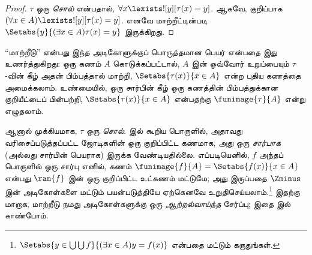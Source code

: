 \documentclass[../../../include/open-logic-section]{subfiles}
\begin{document}
\begin{proof}
$\tau$ ஒரு \emph{சொல்} என்பதால், $\forall x
\lexists![y][\tau(x) = y]$. ஆகவே, குறிப்பாக $(\forall x \in
A)\lexists![y][\tau(x) = y]$. எனவே மாற்றீட்டின்படி
$\Setabs{y}{(\exists x \in A)\tau(x) = y}$ இருக்கிறது.
\end{proof}
\noindent
``மாற்றீடு'' என்பது இந்த அடிகோளுக்குப் பொருத்தமான பெயர் என்பதை இது
உணர்த்துகிறது: ஒரு கணம் $A$ கொடுக்கப்பட்டால், $A$ இன் ஒவ்வோர் உறுப்பையும்
$\tau$-வின் கீழ் அதன் பிம்பத்தால் மாற்றி, $\Setabs{\tau(x)}{x \in A}$
என்ற புதிய கணத்தை அமைக்கலாம். உண்மையில், ஒரு சார்பின் கீழ் ஒரு கணத்தின்
பிம்பத்துக்கான குறியீட்டைப் பின்பற்றி, $\Setabs{\tau(x)}{x \in A}$
என்பதற்கு $\funimage{\tau}{A}$ என்று எழுதலாம்.

ஆனால் முக்கியமாக, $\tau$ ஒரு \emph{சொல்}. 
இல் கூறிய பொருளில், அதாவது வரிசைப்படுத்தப்பட்ட ஜோடிகளின் ஒரு குறிப்பிட்ட
கணமாக, அது ஒரு \emph{சார்பாக} (அல்லது சார்பின் பெயராக) இருக்க வேண்டியதில்லை.
எப்படியெனில், $f$ அந்தப் பொருளில் ஒரு சார்பு எனில், கணம்
$\funimage{f}{A} = \Setabs{f(x)}{x \in A}$ என்பது $\ran{f}$ இன் ஒரு
குறிப்பிட்ட உட்கணம் மட்டுமே; அது இருப்பதை $\Zminus$ இன் அடிகோள்களை மட்டும்
பயன்படுத்தியே ஏற்கெனவே உறுதிசெய்யலாம்.\footnote{$\Setabs{y \in \bigcup
\bigcup f}{(\exists x \in A)y = f(x)}$ என்பதை மட்டும் கருதுங்கள்.}
இதற்கு மாறாக, மாற்றீடு நமது அடிகோள்களுக்கு ஒரு \emph{ஆற்றல்வாய்ந்த}
சேர்ப்பு; இதை  இல் காண்போம்.
\end{document}
